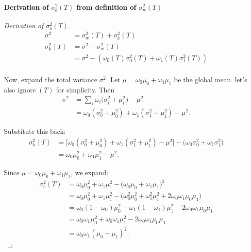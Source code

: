 \paragraph{Derivation of \(\sigma_b^2(T)\) from definition of \(\sigma_w^2(T)\)}

\begin{proof}[Derivation of \(\sigma_b^2(T)\)]
  
\begin{align*}
  \sigma^2 & = \sigma_w^2(T) + \sigma_b^2(T) \\
  \sigma_b^2(T) & = \sigma^2 - \sigma_w^2(T)\\
  &= \sigma^2 - \left( \omega_0(T) \sigma_0^2(T) + \omega_1(T) \sigma_1^2(T) \right)\\
\end{align*}

Now, expand the total variance \(\sigma^2\).  
Let \(\mu = \omega_0\mu_0 + \omega_1\mu_1\) be the global mean. 
let's also ignore $(T)$ for simplicity.
Then
\begin{align*}
  \sigma^2 &= \sum_{i} \omega_i \big(\sigma_i^2 + \mu_i^2\big) - \mu^2 \\[6pt]
           &= \omega_0(\sigma_0^2 + \mu_0^2) + \omega_1(\sigma_1^2 + \mu_1^2) - \mu^2.
\end{align*}

Substitute this back:
\begin{align*}
  \sigma_b^2(T)
  &= \Big[\omega_0(\sigma_0^2 + \mu_0^2) + \omega_1(\sigma_1^2 + \mu_1^2) - \mu^2\Big]
     - \Big(\omega_0\sigma_0^2 + \omega_1\sigma_1^2\Big) \\[6pt]
  &= \omega_0\mu_0^2 + \omega_1\mu_1^2 - \mu^2.
\end{align*}

Since \(\mu = \omega_0\mu_0 + \omega_1\mu_1\), we expand:
\begin{align*}
  \sigma_b^2(T)
  &= \omega_0\mu_0^2 + \omega_1\mu_1^2 - \big(\omega_0\mu_0 + \omega_1\mu_1\big)^2 \\[6pt]
  &= \omega_0\mu_0^2 + \omega_1\mu_1^2
     - \big(\omega_0^2\mu_0^2 + \omega_1^2\mu_1^2 + 2\omega_0\omega_1\mu_0\mu_1\big) \\[6pt]
  &= \omega_0(1-\omega_0)\mu_0^2 + \omega_1(1-\omega_1)\mu_1^2 - 2\omega_0\omega_1\mu_0\mu_1 \\[6pt]
  &= \omega_0\omega_1\mu_0^2 + \omega_0\omega_1\mu_1^2 - 2\omega_0\omega_1\mu_0\mu_1 \\[6pt]
  &= \omega_0\omega_1(\mu_0 - \mu_1)^2.
\end{align*}
  
\end{proof}

